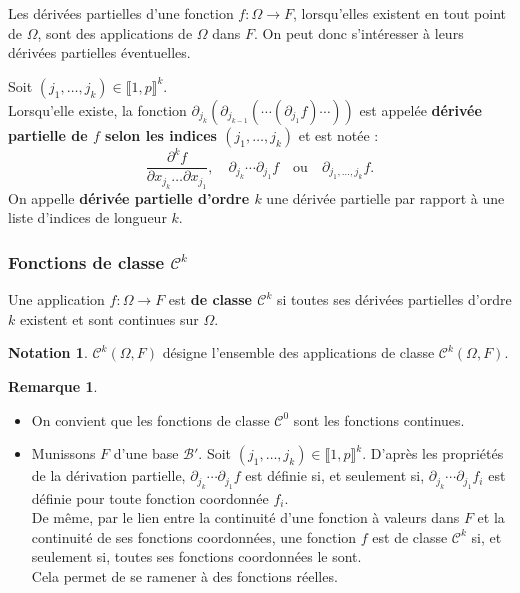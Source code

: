 \documentclass[french]{article}
\theoremstyle{plain}
\theoremstyle{definition}
\newtheorem*{rmq}{Remarque}
\newtheorem*{notation}{Notation}
\theoremstyle{remark}
\begin{document}
Les dérivées partielles d'une fonction $f:\Omega\to F$, lorsqu'elles existent en tout point de $\Omega$, sont des applications de $\Omega$ dans $F$. On peut donc s'intéresser à leurs dérivées partielles éventuelles.

\begin{dfn}
	Soit $(j_1,\ldots,j_k)\in\llbracket1,p\rrbracket^k$.\\
	Lorsqu'elle existe, la fonction $\partial_{j_k}\left(\partial_{j_{k-1}}(\cdots(\partial_{j_1}f)\cdots)\right)$ est appelée \textbf{dérivée partielle de $f$ selon les indices $(j_1,\ldots,j_k)$} et est notée :
	$$\frac{\partial^k f}{\partial x_{j_k}\dots\partial x_{j_1}},\quad \partial_{j_k}\cdots\partial_{j_1}f\quad\text{ou}\quad\partial_{j_1,\ldots,j_k}f.$$
	On appelle \textbf{dérivée partielle d'ordre $k$} une dérivée partielle par rapport à une liste d'indices de longueur $k$.
\end{dfn}

\subsubsection*{Fonctions de classe $\mathcal{C}^k$}

\begin{dfn}
	Une application $f:\Omega\to F$ est \textbf{de classe $\mathcal{C}^k$} si toutes ses dérivées partielles d'ordre $k$ existent et sont continues sur $\Omega$.
\end{dfn}

\begin{notation}
	$\mathcal{C}^k(\Omega,F)$ désigne l'ensemble des applications de classe $\mathcal{C}^k(\Omega,F)$.
\end{notation}

\begin{rmq}
	\begin{itemize}
		\item On convient que les fonctions de classe $\mathcal{C}^0$ sont les fonctions continues.
		\item Munissons $F$ d'une base $\mathcal{B}'$. Soit $(j_1,\ldots,j_k)\in\llbracket1,p\rrbracket^k$. D'après les propriétés de la dérivation partielle, $\partial_{j_k}\cdots\partial_{j_1}f$ est définie si, et seulement si, $\partial_{j_k}\cdots\partial_{j_1}f_i$ est définie pour toute fonction coordonnée $f_i$.\\
		De même, par le lien entre la continuité d'une fonction à valeurs dans $F$ et la continuité de ses fonctions coordonnées, une fonction $f$ est de classe $\mathcal{C}^k$ si, et seulement si, toutes ses fonctions coordonnées le sont.\\
		Cela permet de se ramener à des fonctions réelles.
	\end{itemize}
\end{rmq}
\end{document}
